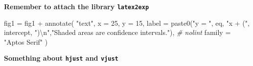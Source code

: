 \documentclass[
]{article}
\newenvironment{Shaded}{}{}
\newcommand{\AttributeTok}[1]{\textcolor[rgb]{0.49,0.56,0.16}{#1}}
\newcommand{\CommentTok}[1]{\textcolor[rgb]{0.38,0.63,0.69}{\textit{#1}}}
\newcommand{\DecValTok}[1]{\textcolor[rgb]{0.25,0.63,0.44}{#1}}
\newcommand{\FunctionTok}[1]{\textcolor[rgb]{0.02,0.16,0.49}{#1}}
\newcommand{\NormalTok}[1]{#1}
\newcommand{\OtherTok}[1]{\textcolor[rgb]{0.00,0.44,0.13}{#1}}
\newcommand{\SpecialCharTok}[1]{\textcolor[rgb]{0.25,0.44,0.63}{#1}}
\newcommand{\StringTok}[1]{\textcolor[rgb]{0.25,0.44,0.63}{#1}}
\begin{document}
\textbf{Remember to attach the library \texttt{latex2exp}}

\begin{Shaded}
\begin{Highlighting}[]
\NormalTok{fig1 }\OtherTok{=}
\NormalTok{  fig1 }\SpecialCharTok{+}
  \FunctionTok{annotate}\NormalTok{(}
    \StringTok{"text"}\NormalTok{,}
    \AttributeTok{x =} \DecValTok{25}\NormalTok{,}
    \AttributeTok{y =} \DecValTok{15}\NormalTok{,}
    \AttributeTok{label =} \FunctionTok{paste0}\NormalTok{(}\StringTok{"y = "}\NormalTok{, eq, }\StringTok{"x + ("}\NormalTok{, intercept, }\StringTok{")}\SpecialCharTok{\textbackslash{}n}\StringTok{"}\NormalTok{,}\StringTok{"Shaded areas are confidence intervals."}\NormalTok{), }\CommentTok{\# nolint}
    \AttributeTok{family =} \StringTok{"Aptos Serif"}
\NormalTok{  )}
\end{Highlighting}
\end{Shaded}

\begin{Shaded}
\end{Shaded}

\textbf{Something about \texttt{hjust} and \texttt{vjust}}
\end{document}
